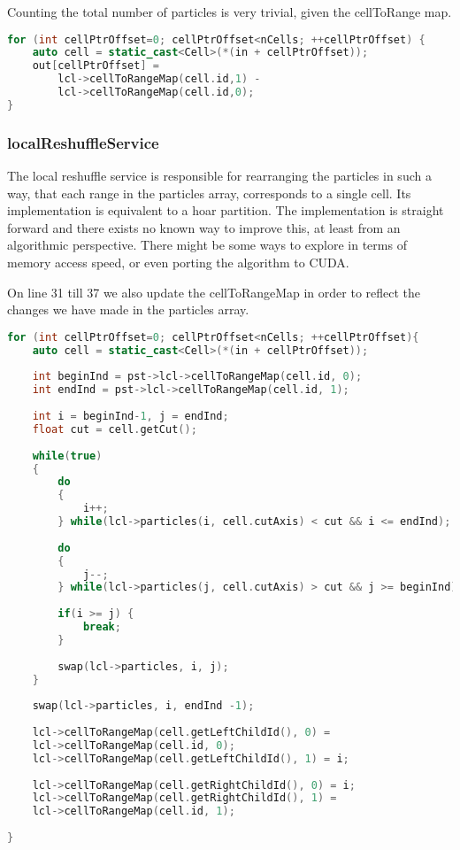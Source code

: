 \documentclass[]{article}
\begin{document}
Counting the total number of particles is very trivial, given the cellToRange map. 

\begin{lstlisting}[language=c++]
for (int cellPtrOffset=0; cellPtrOffset<nCells; ++cellPtrOffset) {
	auto cell = static_cast<Cell>(*(in + cellPtrOffset));
	out[cellPtrOffset] = 
		lcl->cellToRangeMap(cell.id,1) - 
		lcl->cellToRangeMap(cell.id,0);
}

\end{lstlisting}

\subsubsection{localReshuffleService}
The local reshuffle service is responsible for rearranging the particles in such a way, that each range in the particles array, corresponds to a single cell. 
Its implementation is equivalent to a hoar partition. The implementation is straight forward and there exists no known way to improve this, at least from an algorithmic perspective. There might be some ways to explore in terms of memory access speed, or even porting the algorithm to CUDA. 
 
On line 31 till 37 we also update the cellToRangeMap in order to reflect the changes we have made in the particles array.

\begin{lstlisting}[language=c++]
for (int cellPtrOffset=0; cellPtrOffset<nCells; ++cellPtrOffset){
	auto cell = static_cast<Cell>(*(in + cellPtrOffset));
	
	int beginInd = pst->lcl->cellToRangeMap(cell.id, 0);
	int endInd = pst->lcl->cellToRangeMap(cell.id, 1);
	
	int i = beginInd-1, j = endInd;
	float cut = cell.getCut();
	
	while(true)
	{
		do
		{
			i++;
		} while(lcl->particles(i, cell.cutAxis) < cut && i <= endInd);
		
		do
		{
			j--;
		} while(lcl->particles(j, cell.cutAxis) > cut && j >= beginInd);
		
		if(i >= j) {
			break;
		}
		
		swap(lcl->particles, i, j);
	}
	
	swap(lcl->particles, i, endInd -1);
	
	lcl->cellToRangeMap(cell.getLeftChildId(), 0) =
	lcl->cellToRangeMap(cell.id, 0);
	lcl->cellToRangeMap(cell.getLeftChildId(), 1) = i;
	
	lcl->cellToRangeMap(cell.getRightChildId(), 0) = i;
	lcl->cellToRangeMap(cell.getRightChildId(), 1) =
	lcl->cellToRangeMap(cell.id, 1);
	
}
\end{lstlisting}
\end{document}
